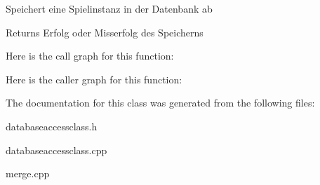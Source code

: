 Speichert eine Spielinstanz in der Datenbank ab 

\begin{DoxyReturn}{Returns}
Erfolg oder Misserfolg des Speicherns
\end{DoxyReturn}


Here is the call graph for this function\-:




Here is the caller graph for this function\-:




The documentation for this class was generated from the following files\-:\begin{DoxyCompactItemize}
\item 
databaseaccessclass.\-h\item 
databaseaccessclass.\-cpp\item 
merge.\-cpp\end{DoxyCompactItemize}
